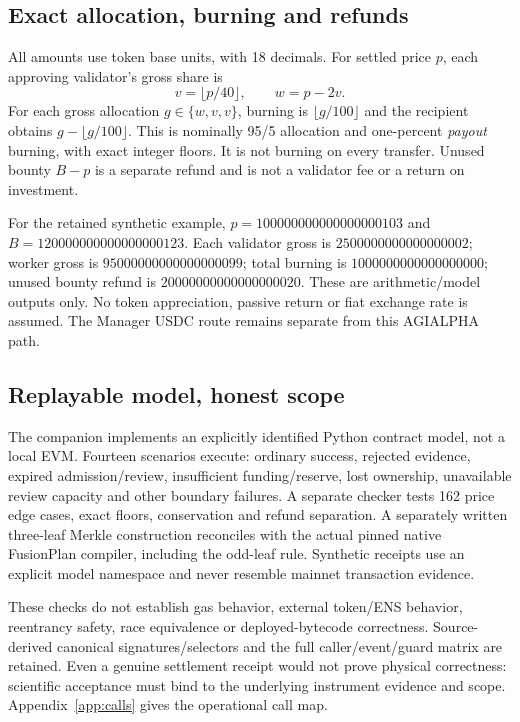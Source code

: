 \documentclass[11pt,letterpaper]{article}
\begin{document}
\subsection{Exact allocation, burning and refunds}
All amounts use token base units, with 18 decimals. For settled price $p$, each approving validator's gross share is
\begin{equation}
v=\lfloor p/40\rfloor,\qquad w=p-2v.
\end{equation}
For each gross allocation $g\in\{w,v,v\}$, burning is $\lfloor g/100\rfloor$ and the recipient obtains $g-\lfloor g/100\rfloor$. This is nominally 95/5 allocation and one-percent \emph{payout} burning, with exact integer floors. It is not burning on every transfer. Unused bounty $B-p$ is a separate refund and is not a validator fee or a return on investment.

For the retained synthetic example, $p=100000000000000000103$ and $B=120000000000000000123$. Each validator gross is $2500000000000000002$; worker gross is $95000000000000000099$; total burning is $1000000000000000000$; unused bounty refund is $20000000000000000020$. These are arithmetic/model outputs only. No token appreciation, passive return or fiat exchange rate is assumed. The Manager USDC route remains separate from this AGIALPHA path.

\subsection{Replayable model, honest scope}
The companion implements an explicitly identified Python contract model, not a local EVM. Fourteen scenarios execute: ordinary success, rejected evidence, expired admission/review, insufficient funding/reserve, lost ownership, unavailable review capacity and other boundary failures. A separate checker tests 162 price edge cases, exact floors, conservation and refund separation. A separately written three-leaf Merkle construction reconciles with the actual pinned native FusionPlan compiler, including the odd-leaf rule. Synthetic receipts use an explicit model namespace and never resemble mainnet transaction evidence.

These checks do not establish gas behavior, external token/ENS behavior, reentrancy safety, race equivalence or deployed-bytecode correctness. Source-derived canonical signatures/selectors and the full caller/event/guard matrix are retained. Even a genuine settlement receipt would not prove physical correctness: scientific acceptance must bind to the underlying instrument evidence and scope. Appendix~\ref{app:calls} gives the operational call map.
\end{document}
